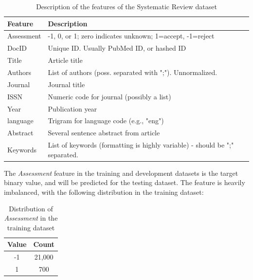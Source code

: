 \documentclass[11pt]{article}
\begin{document}
\begin{table}[!ht]
    \caption{Description of the features of the Systematic Review dataset}
    \begin{center}

        \begin{tabular}{| l | l |}
        \hline
        \textbf{Feature} & \textbf{Description}
        \\ \hline
        Assessment & -1, 0, or 1; zero indicates unknown; 1=accept, -1=reject
        \\ \hline
        DocID & Unique ID. Usually PubMed ID, or hashed ID
        \\ \hline
        Title & Article title
        \\ \hline
        Authors & List of authors (poss. separated with ";"). Unnormalized.
        \\ \hline
        Journal & Journal title
        \\ \hline
        ISSN & Numeric code for journal (possibly a list)
        \\ \hline
        Year & Publication year
        \\ \hline
        language & Trigram for language code (e.g., "eng")
        \\ \hline
        Abstract & Several sentence abstract from article
        \\ \hline
        Keywords & List of keywords (formatting is highly variable) - should be ";" separated.
        \\ \hline
        \end{tabular}

    \end{center}

\end{table}

The \textit{Assessment} feature in the training and development datasets is the target binary value, and will be predicted for the testing dataset. The feature is heavily imbalanced, with the following distribution in the training dataset:

\begin{table}[!ht]
    \caption{Distribution of \textit{Assessment} in the training dataset}
    \begin{center}

        \begin{tabular}{| c | c |}
        \hline
        \textbf{Value} & \textbf{Count}
        \\ \hline
        -1 & 21,000
        \\ \hline
        1 & 700
        \\ \hline
        \end{tabular}

    \end{center}

\end{table}
\end{document}
